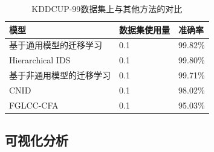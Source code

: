 \begin{table}[htbp]
    \centering
        \caption{KDDCUP-99数据集上与其他方法的对比}
    \begin{tabular}{lll}
    \toprule
        模型 & 数据集使用量 & 准确率 \\ \midrule
        基于通用模型的迁移学习& 0.1&99.82\%\\
        Hierarchical IDS\cite{10.3390/sym12020203} & 0.1 & 99.80\% \\
        基于非通用模型的迁移学习& 0.1&99.71\%\\
        CNID\cite{10.1155/2020/4705982}& 0.1 & 98.02\% \\
        FGLCC-CFA\cite{10.1016/j.jisa.2018.11.007}& 0.1 & 95.03\% \\
        \bottomrule
    \end{tabular}

    \label{tab:compare_transfer_other}
\end{table}

\subsection{可视化分析}


